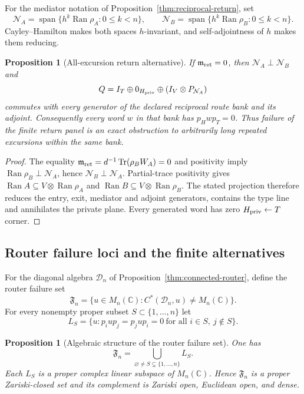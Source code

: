 \documentclass[11pt]{article}
\numberwithin{equation}{section}
\newtheorem{proposition}[theorem]{Proposition}
\theoremstyle{definition}
\theoremstyle{remark}
\newcommand{\C}{\mathbb C}
\newcommand{\Tr}{\operatorname{Tr}}
\newcommand{\Ran}{\operatorname{Ran}}
\newcommand{\Span}{\operatorname{span}}
\begin{document}
For the mediator notation of Proposition~\ref{thm:reciprocal-return}, set
\[
 \mathcal N_A=\Span\{h^k\Ran\rho_A:0\le k<n\},\qquad
 \mathcal N_B=\Span\{h^k\Ran\rho_B:0\le k<n\}.
\]
Cayley--Hamilton makes both spaces $h$-invariant, and self-adjointness of $h$
makes them reducing.

\begin{proposition}[All-excursion return alternative]
\label{prop:all-excursion-return}
If $\mathfrak m_{\rm ret}=0$, then
$\mathcal N_A\perp\mathcal N_B$ and
\[
 Q=I_T\oplus0_{H_{\rm priv}}\oplus(I_V\otimes P_{\mathcal N_A})
\]
commutes with every generator of the declared reciprocal route bank and its
adjoint.  Consequently every word $w$ in that bank has
$p_Hwp_T=0$.  Thus failure of the finite return panel is an exact obstruction
to arbitrarily long repeated excursions within the same bank.
\end{proposition}

\begin{proof}
The equality $\mathfrak m_{\rm ret}=d^{-1}\Tr(\rho_BW_A)=0$ and positivity
imply $\Ran\rho_B\perp\mathcal N_A$, hence
$\mathcal N_B\perp\mathcal N_A$.  Partial-trace positivity gives
$\Ran A\subseteq V\otimes\Ran\rho_A$ and
$\Ran B\subseteq V\otimes\Ran\rho_B$.  The stated projection therefore
reduces the entry, exit, mediator and adjoint generators, contains the type
line and annihilates the private plane.  Every generated word has zero
$H_{\rm priv}\leftarrow T$ corner.
\end{proof}


\subsection{Router failure loci and the finite alternatives}

For the diagonal algebra $\mathcal D_n$ of
Proposition~\ref{thm:connected-router}, define the router failure set
\[
\mathfrak F_n
=
\{u\in M_n(\C):C^*(\mathcal D_n,u)\ne M_n(\C)\}.
\]
For every nonempty proper subset $S\subset\{1,\ldots,n\}$ let
\[
L_S
=
\{u:p_iup_j=p_jup_i=0\ \text{for all }i\in S,
\ j\notin S\}.
\]

\begin{proposition}[Algebraic structure of the router failure set]
\label{prop:router-failure-locus}
One has
\begin{equation}
\mathfrak F_n
=
\bigcup_{\varnothing\ne S\subsetneq\{1,\ldots,n\}}L_S.
\label{eq:router-failure-locus}
\end{equation}
Each $L_S$ is a proper complex linear subspace of $M_n(\C)$.  Hence
$\mathfrak F_n$ is a proper Zariski-closed set and its complement is Zariski
open, Euclidean open, and dense.
\end{proposition}
\end{document}
